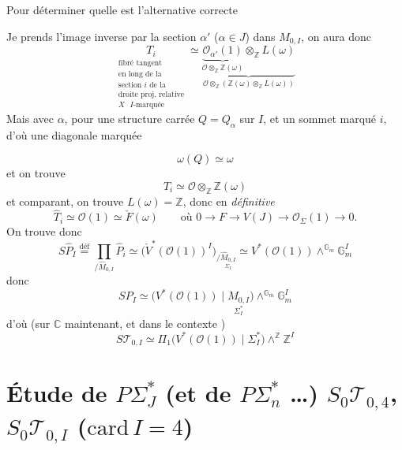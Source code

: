 \documentclass[11pt,a4paper]{article}
\begin{document}
Pour déterminer quelle est l'alternative correcte

Je prends l'image inverse par la section \struck{\ill{}} $\alpha'$ ($\alpha \in J$) dans $M_{0,I}$, on aura donc
\[
  \underset{\substack{\text{fibré tangent} \\ \text{en long de la} \\ \text{section $i$ de la} \\ \text{droite proj.\ relative} \\ \text{$X$ $I$-marquée}}}{T_i}
  \simeq \underbrace{\underbrace{\mathcal{O}_{\alpha'}(1)}_{\mathcal{O} \otimes_{\mathbb{Z}} \mathbb{Z}(\omega)} \otimes_{\mathbb{Z}} L(\omega)}_{\mathcal{O} \otimes_{\mathbb{Z}} (\mathbb{Z}(\omega) \otimes_{\mathbb{Z}} L(\omega))}
\]
Mais avec $\alpha$, pour une structure carrée $Q = Q_\alpha$ sur $I$, et un sommet marqué $i$, d'où une diagonale marquée


\[
  \omega(Q) \simeq \omega
\]
et on trouve
\[
  T_i \simeq \mathcal{O} \otimes_{\mathbb{Z}} \mathbb{Z}(\omega)
\]
et comparant, on trouve $L(\omega) = \mathbb{Z}$, donc en \textit{définitive}
\[
  \boxed{\hat T_i \simeq \mathcal{O}(1)} \simeq \check F(\omega)
  \qquad \text{où } 0 \to F \to V(J) \to \mathcal{O}_\Sigma(1) \to 0 .
\]
On trouve donc
\[
  S\hat P_I \overset{\mathrm{déf}}{=} \prod_{/\hat M_{0,I}} \hat P_i
  \simeq \bigl(\check V^*(\mathcal{O}(1))^{I}\bigr)_{/\underset{\Sigma_I}{\hat M_{0,I}}}
  \simeq V^*(\mathcal{O}(1)) \wedge^{\mathbb{G}_m} \mathbb{G}_m^I
\]
donc
\[
  SP_I \simeq \bigl(V^*(\mathcal{O}(1)) \mid \underset{\Sigma_I^*}{M_{0,I}}\bigr) \wedge^{\mathbb{G}_m} \mathbb{G}_m^I
\]
d'où (sur $\mathbb{C}$ maintenant, et dans le contexte )
\[
  S\mathcal{T}_{0,I} \simeq \Pi_1\bigl(V^*(\mathcal{O}(1)) \mid \Sigma_I^*\bigr) \wedge^{\mathbb{Z}} \mathbb{Z}^I
\]

\section{Étude de $P\Sigma_J^*$ (et de $P\Sigma_n^*$ …) $S_0\mathcal{T}_{0,4}$, $S_0\mathcal{T}_{0,I}$ ($\mathrm{card}\, I = 4$)}
\end{document}
